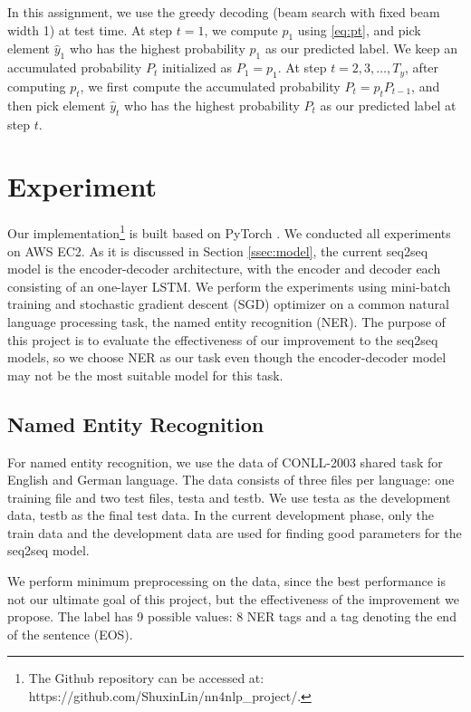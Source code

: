 \documentclass[11pt,a4paper]{article}
\begin{document}
In this assignment, we use the greedy decoding (beam search with fixed beam width 1) at test time. At step $t = 1$, we compute $p_1$ using \eqref{eq:pt}, and pick element $\hat{y}_1$ who has the highest probability $p_1$ as our predicted label. We keep an accumulated probability $P_t$ initialized as $P_1 = p_1$. At step $t = 2, 3, \dots, T_y$, after computing $p_t$, we first compute the accumulated probability $P_t = p_t P_{t-1}$, and then pick element $\hat{y}_t$ who has the highest probability $P_t$ as our predicted label at step $t$.



\section{Experiment}

Our implementation\footnote{The Github repository can be accessed at: https://github.com/ShuxinLin/nn4nlp\_project/.} is built based on PyTorch \cite{paszke2017automatic}. We conducted all experiments on AWS EC2. As it is discussed in Section \ref{ssec:model}, the current seq2seq model is the encoder-decoder architecture, with the encoder and decoder each consisting of an one-layer LSTM. We perform the experiments using mini-batch training and stochastic gradient descent (SGD) optimizer on a common natural language processing task, the named entity recognition (NER). The purpose of this project is to evaluate the effectiveness of our improvement to the seq2seq models, so we choose NER as our task even though the encoder-decoder model may not be the most suitable model for this task.


\subsection{Named Entity Recognition} \label{ssec:ner}

For named entity recognition, we use the data of CONLL-2003 shared task \cite{tjongkimsang2003conll} for English and German language. The data consists of three files per language: one training file and two test files, testa and testb. We use testa as the development data, testb as the final test data. In the current development phase, only the train data and the development data are used for finding good parameters for the seq2seq model. 

We perform minimum preprocessing on the data, since the best performance is not our ultimate goal of this project, but the effectiveness of the improvement we propose. The label has 9 possible values: 8 NER tags and a tag denoting the end of the sentence (EOS).
\end{document}
